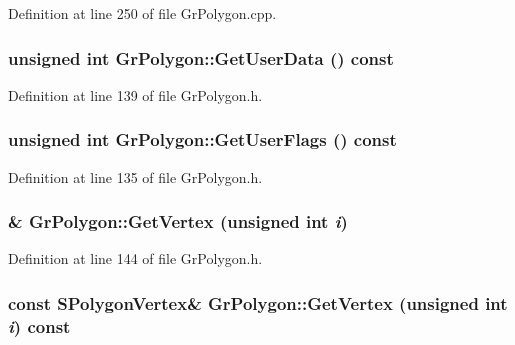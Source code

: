 \begin{CompactItemize}
Definition at line 250 of file GrPolygon.cpp.\hypertarget{class_gr_polygon_04b63ed7546dbcef1df9eb1ebcf19161}{
\subsubsection[{GetUserData}]{\setlength{\rightskip}{0pt plus 5cm}unsigned int GrPolygon::GetUserData () const}}
\label{class_gr_polygon_04b63ed7546dbcef1df9eb1ebcf19161}




Definition at line 139 of file GrPolygon.h.\hypertarget{class_gr_polygon_e84a5f1368f9741416f654a6d3d6c05a}{
\subsubsection[{GetUserFlags}]{\setlength{\rightskip}{0pt plus 5cm}unsigned int GrPolygon::GetUserFlags () const}}
\label{class_gr_polygon_e84a5f1368f9741416f654a6d3d6c05a}




Definition at line 135 of file GrPolygon.h.\hypertarget{class_gr_polygon_fad4b14c5d81b50c943d1576657a05f0}{
\subsubsection[{GetVertex}]{\& GrPolygon::GetVertex (unsigned int {\em i})}}
\label{class_gr_polygon_fad4b14c5d81b50c943d1576657a05f0}




Definition at line 144 of file GrPolygon.h.\hypertarget{class_gr_polygon_5af4ec7c3b097b081a44b79f904baacd}{
\subsubsection[{GetVertex}]{\setlength{\rightskip}{0pt plus 5cm}const {\bf SPolygonVertex}\& GrPolygon::GetVertex (unsigned int {\em i}) const}}
\label{class_gr_polygon_5af4ec7c3b097b081a44b79f904baacd}





\end{CompactItemize}
